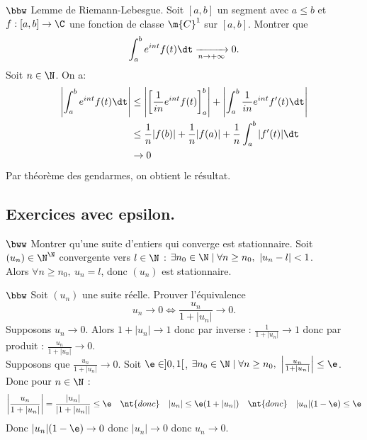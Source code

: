 \documentclass[11pt]{article}
\begin{document}
\begin{exercice}{$\bbw$ Lemme de Riemann-Lebesgue.}{}
    Soit $[a,b]$ un segment avec $a\leq b$ et $f:[a,b]\to\C$ une fonction de classe $\m{C}^1$ sur $[a,b]$. Montrer que
    \begin{equation*}
        \int_a^be^{int}f(t)\dt \xrightarrow[n\to+\infty]{}0.
    \end{equation*}
    \tcblower
    Soit $n\in\N$. On a:
    \begin{align*}
        \left|\int_a^be^{int}f(t)\dt\right| &\leq \left|\left[ \frac{1}{in}e^{int} f(t) \right]_a^b\right| + \left|\int_a^b\frac{1}{in}e^{int}f'(t)\dt\right|\\
        &\leq\frac{1}{n}|f(b)| + \frac{1}{n}|f(a)| + \frac{1}{n}\int_a^b|f'(t)|\dt\\
        &\to0
    \end{align*}
    Par théorème des gendarmes, on obtient le résultat.
\end{exercice}

\subsection*{Exercices avec epsilon.}

\begin{exercice}{$\bww$}{}
    Montrer qu'une suite d'entiers qui converge est stationnaire.
    \tcblower
    Soit $(u_n)\in\N^\N$ convergente vers $l\in\N$ : $\exists n_0 \in \N \mid \forall n \geq n_0, ~ |u_n - l| < 1$.\\
    Alors $\forall n \geq n_0, ~ u_n = l$, donc $(u_n)$ est stationnaire.
\end{exercice}

\begin{exercice}{$\bbw$}{}
    Soit $(u_n)$ une suite réelle. Prouver l'équivalence
    \begin{equation*}
        u_n \to 0 \iff \frac{u_n}{1+|u_n|}\to0.
    \end{equation*}
    \tcblower
    \boxed{\ra} Supposons $u_n\to0$. Alors $1+|u_n|\to 1$ donc par inverse :  $\frac{1}{1+|u_n|}\to1$ donc par produit : $\frac{u_n}{1+|u_n|}\to0$.\\
    \boxed{\la} Supposons que $\frac{u_n}{1+|u_n|}\to0$. Soit $\e\in]0,1[$, $\exists n_0 \in \N \mid \forall n \geq n_0, ~ \left|\frac{u_n}{1+|u_n|}\right| \leq \e$. Donc pour $n\in\N$ : 
    \begin{equation*}
        \left|\frac{u_n}{1+|u_n|}\right| = \frac{|u_n|}{|1+|u_n||} \leq \e \quad \nt{donc} \quad |u_n| \leq \e(1+|u_n|) \quad \nt{donc} \quad |u_n|(1-\e) \leq \e
    \end{equation*}
    Donc $|u_n|(1-\e)\to0$ donc $|u_n|\to0$ donc $u_n\to0$.
\end{exercice}
\end{document}
